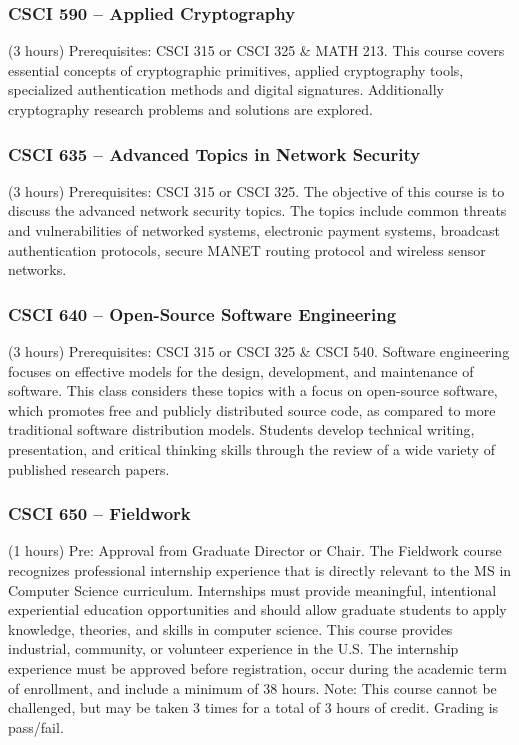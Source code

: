 \subsubsection{CSCI 590 -- Applied Cryptography}
(3 hours) Prerequisites:  CSCI 315 or CSCI 325 \& MATH 213. This course covers essential concepts of cryptographic primitives, applied cryptography tools, specialized authentication methods and digital signatures. Additionally cryptography research problems and solutions are explored.

\subsubsection{CSCI 635 -- Advanced Topics in Network Security}
(3 hours) Prerequisites:  CSCI 315 or CSCI 325. The objective of this course is to discuss the advanced network security topics. The topics include common threats and vulnerabilities of networked systems, electronic payment systems, broadcast authentication protocols, secure MANET routing protocol and wireless sensor networks. 

\subsubsection{CSCI 640 -- Open-Source Software Engineering}
(3 hours) Prerequisites: CSCI 315 or CSCI 325 \& CSCI 540. Software engineering focuses on effective models for the design, development, and maintenance of software. This class considers these topics with a focus on open-source software, which promotes free and publicly distributed source code, as compared to more traditional software distribution models. Students develop technical writing, presentation, and critical thinking skills through the review of a wide variety of published research papers.

\subsubsection{CSCI 650 -- Fieldwork}
(1 hours) Pre: Approval from Graduate Director or Chair. The Fieldwork course recognizes professional internship experience that is directly relevant to the MS in Computer Science curriculum. Internships must provide meaningful, intentional experiential education opportunities and should allow graduate students to apply knowledge, theories, and skills in computer science. This course provides industrial, community, or volunteer experience in the U.S. The internship experience must be approved before registration, occur during the academic term of enrollment, and include a minimum of 38 hours. Note: This course cannot be challenged, but may be taken 3 times for a total of 3 hours of credit. Grading is pass/fail.

